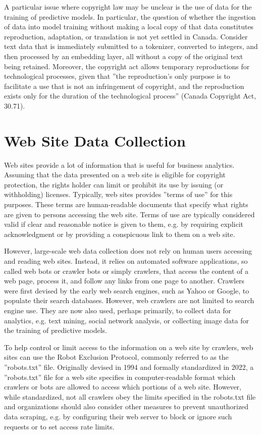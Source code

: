 A particular issue where copyright law may be unclear is the use of data for the training of predictive models. In particular, the question of whether the ingestion of data into model training without making a local copy of that data constitutes reproduction, adaptation, or translation is not yet settled in Canada. Consider text data that is immediately submitted to a tokenizer, converted to integers, and then processed by an embedding layer, all without a copy of the original text being retained. Moreover, the copyright act allows temporary reproductions for technological processes, given that ''the reproduction's only purpose is to facilitate a use that is not an infringement of copyright, and the reproduction exists only for the duration of the technological process'' (Canada Copyright Act, 30.71).

\section{Web Site Data Collection}

Web sites provide a lot of information that is useful for business analytics. Assuming that the data presented on a web site is eligible for copyright protection, the rights holder can limit or prohibit its use by issuing (or withholding) licenses. Typically, web sites provides ''terms of use'' for this purposes. These terms are human-readable documents that specify what rights are given to persons accessing the web site. Terms of use are typically considered valid if clear and reasonable notice is given to them, e.g. by requiring explicit acknowledgment or by providing a conspicuous link to them on a web site. 

However, large-scale web data collection does not rely on human users accessing and reading web sites. Instead, it relies on automated software applications, so called web bots or crawler bots or simply crawlers, that access the content of a web page, process it, and follow any links from one page to another. Crawlers were first devised by the early web search engines, such as Yahoo or Google, to populate their search databases. However, web crawlers are not limited to search engine use. They are now also used, perhaps primarily, to collect data for analytics, e.g. text mining, social network analysis, or collecting image data for the training of predictive models. 

To help control or limit access to the information on a web site by crawlers, web sites can use the Robot Exclusion Protocol, commonly referred to as the ''robots.txt'' file. Originally devised in 1994 and formally standardized in 2022, a ''robots.txt'' file for a web site specifies in computer-readable format which crawlers or bots are allowed to access which portions of a web site. However, while standardized, not all crawlers obey the limits specified in the robots.txt file and organizations should also consider other measures to prevent unauthorized data scraping, e.g. by configuring their web server to block or ignore such requests or to set access rate limits. 

